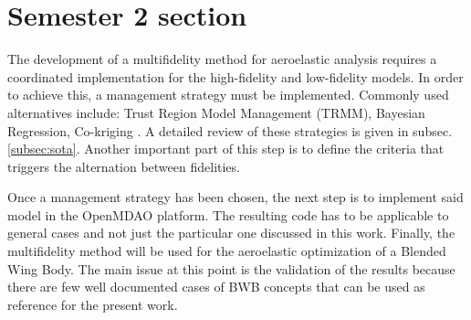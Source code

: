 \section{Semester 2 section}
\label{sec:projectissues}
The development of a multifidelity method for aeroelastic analysis requires a coordinated implementation for the high-fidelity and low-fidelity models. In order to achieve this, a management strategy must be implemented. Commonly used alternatives include: Trust Region Model Management (TRMM), Bayesian Regression, Co-kriging \cite{peherstorfer2018survey}. A detailed review of these strategies is given in subsec. \ref{subsec:sota}. Another important part of this step is to define the criteria that triggers the alternation between fidelities. \par
Once a management strategy has been chosen, the next step is to implement said model in the OpenMDAO platform. The resulting code has to be applicable to general cases and not just the particular one discussed in this work. Finally, the multifidelity method will be used for the aeroelastic optimization of a Blended Wing Body. The main issue at this point is the validation of the results because there are few well documented cases of BWB concepts \cite{Quinlan2019, Bryson2019} that can be used as reference for the present work. 

